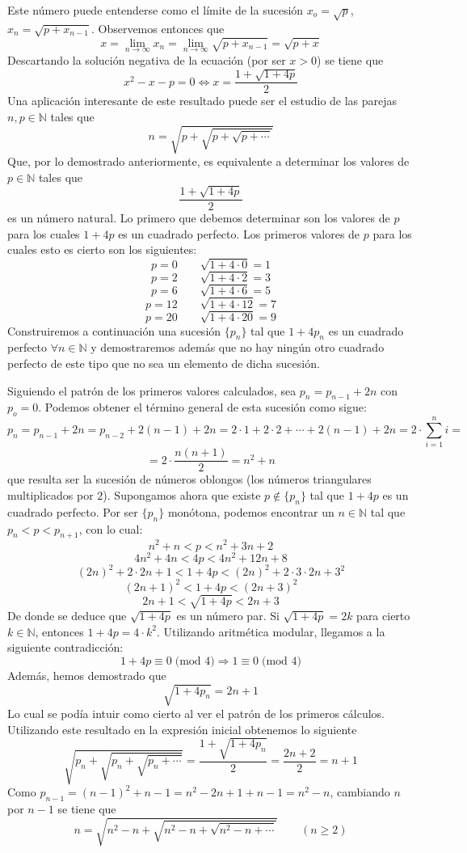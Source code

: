  \begin{sol}

 Este número puede entenderse como el límite de la sucesión  $x_o=\sqrt{p}$, $x_n=\sqrt{p+x_{n-1}}$. Observemos entonces que
 $$x=\lim_{n\to\infty}x_n=\lim_{n\to\infty}\sqrt{p+x_{n-1}}=\sqrt{p+x}$$
 Descartando la solución negativa de la ecuación (por ser $x>0$) se tiene que
 $$x^2-x-p=0\Longleftrightarrow x=\dfrac{1+\sqrt{1+4p}}{2}$$
 Una aplicación interesante de este resultado puede ser el estudio de las parejas $n,p\in\mathbb{N}$ tales que
 $$n=\sqrt{p+\sqrt{p+\sqrt{p+\cdots}}}$$
 Que, por lo demostrado anteriormente, es equivalente a determinar los valores de $p\in\mathbb{N}$ tales que
 $$\dfrac{1+\sqrt{1+4p}}{2}$$
 es un número natural. Lo primero que debemos determinar son los valores de $p$ para los cuales $1+4p$ es un cuadrado perfecto. Los primeros valores de $p$ para los cuales esto es cierto son los siguientes:
 $$p=0\qquad \sqrt{1+4\cdot 0}=1$$
 $$p=2\qquad \sqrt{1+4\cdot 2}=3$$
 $$p=6\qquad \sqrt{1+4\cdot 6}=5$$
 $$p=12\qquad \sqrt{1+4\cdot 12}=7$$
 $$p=20\qquad \sqrt{1+4\cdot 20}=9$$
 Construiremos a continuación una sucesión $\{p_n\}$ tal que $1+4p_n$ es un cuadrado perfecto $\forall n\in\mathbb{N}$ y demostraremos además que no hay ningún otro cuadrado perfecto de este tipo que no sea un elemento de dicha sucesión.
 
 Siguiendo el patrón de los primeros valores calculados, sea $p_n=p_{n-1}+2n$ con $p_o=0$. Podemos obtener el término general de esta sucesión como sigue:
 $$p_n=p_{n-1}+2n=p_{n-2}+2(n-1)+2n=2\cdot 1+2\cdot 2+\cdots+ 2(n-1)+2n=2\cdot \sum_{i=1}^ni=$$
$$=2\cdot \dfrac{n(n+1)}{2}=n^2+n$$
que resulta ser la sucesión de números oblongos (los números triangulares multiplicados por $2$). Supongamos ahora que existe $p\nin\{p_n\}$ tal que $1+4p$ es un cuadrado perfecto. Por ser $\{p_n\}$ monótona, podemos encontrar un $n\in\mathbb{N}$ tal que $p_n<p<p_{n+1}$, con lo cual:
$$n^2+n<p<n^2+3n+2$$
$$4n^2+4n<4p<4n^2+12n+8$$
$$(2n)^2+2\cdot 2n+1<1+4p<(2n)^2+2\cdot 3\cdot 2n+3^2$$
$$(2n+1)^2<1+4p<(2n+3)^2$$
$$2n+1<\sqrt{1+4p}<2n+3$$
De donde se deduce que $\sqrt{1+4p}$ es un número par. Si $\sqrt{1+4p}=2k$ para cierto $k\in\mathbb{N}$, entonces $1+4p=4\cdot k^2$. Utilizando aritmética modular, llegamos a la siguiente contradicción:
$$1+4p\equiv 0 \;\text{(mod 4)}\Longrightarrow 1\equiv 0\;\text{(mod 4)}$$
Además, hemos demostrado que
$$\sqrt{1+4p_n}=2n+1$$
Lo cual se podía intuir como cierto al ver el patrón de los primeros cálculos. Utilizando este resultado en la expresión inicial obtenemos lo siguiente
$$\sqrt{p_n+\sqrt{p_n+\sqrt{p_n+\cdots}}}=\dfrac{1+\sqrt{1+4p_n}}{2}=\dfrac{2n+2}{2}=n+1$$
Como $p_{n-1}=(n-1)^2+n-1=n^2-2n+1+n-1=n^2-n$, cambiando $n$ por $n-1$ se tiene que
 $$n=\sqrt{n^2-n+\sqrt{n^2-n+\sqrt{n^2-n+\cdots}}}\qquad (n\geq 2)$$
  
 \end{sol}
